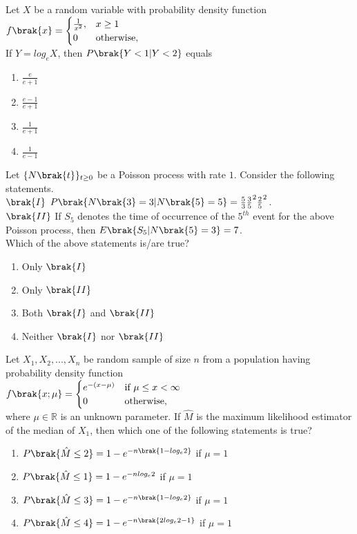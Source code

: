     \item Let $X$ be a random variable with probability density function\\$f\brak{x}=\begin{cases}
        \frac{1}{x^2}, & x\geq 1\\ 0 & \text{otherwise},
    \end{cases}$\\
      If $Y=log_e X$, then $P\brak{Y<1|Y<2}$ equals  
    \begin{enumerate}
        \item $\frac{e}{e+1}$
        \item $\frac{e-1}{e+1}$
        \item $\frac{1}{e+1}$ 
        \item $\frac{1}{e-1}$
    \end{enumerate}
    \item Let $\{N\brak{t}\}_{t\geq 0}$ be a Poisson process with rate $1$. Consider the following statements.\\$\brak{I}$ $P\brak{N\brak{3}=3|N\brak{5}=5}=\frac{5}{3}\frac{3}{5}^2\frac{2}{5}^2$.\\ $\brak{II}$ If $S_5$ denotes the time of occurrence of the $5^{th}$ event for the above Poisson process, then $E\brak{S_5|N\brak{5}=3}=7$.\\Which of the above statements is/are true?
    \begin{enumerate}
        \item Only $\brak{I}$
        \item Only $\brak{II}$
        \item Both $\brak{I}$ and $\brak{II}$
        \item Neither $\brak{I}$ nor $\brak{II}$
    \end{enumerate}
    \item Let $X_1, X_2, ..., X_n$ be random sample of size $n$ from a population having probability density function\\$f\brak{x;\mu}=\begin{cases} e^{-(x-\mu)} & \text{if } \mu \leq x < \infty \\ 0 & \text{otherwise,} \end{cases}$\\ where $\mu \in \mathbb{R}$ is an unknown parameter. If $\hat{M}$ is the maximum likelihood estimator of the median of $X_1$, then which one of the following statements is true?
\begin{enumerate}
    \item $P\brak{\hat{M}\leq 2}=1-e^{-n\brak{1-log_e2}}$ if $\mu=1$
    \item $P\brak{\hat{M}\leq 1}=1-e^{-nlog_e2}$ if $\mu=1$
    \item $P\brak{\hat{M}\leq 3}=1-e^{-n\brak{1-log_e2}}$ if $\mu=1$
    \item $P\brak{\hat{M}\leq 4}=1-e^{-n\brak{2log_e2-1}}$ if $\mu=1$
\end{enumerate}

  
